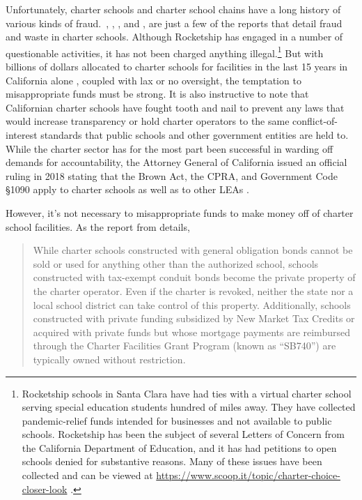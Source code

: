 Unfortunately, charter schools and charter school chains have a long history of various kinds of fraud. \textcite{Lafer2017}, \textcite{ITPT2018}, \textcite{Burris.etal2020}, and \textcite{Burris.Bryant2020}, are just a few of the reports that detail fraud and waste in charter schools. Although Rocketship has engaged in a number of questionable activities, it has not been charged anything illegal.\footnote{Rocketship schools in Santa Clara have had ties with a virtual charter school serving special education students hundred of miles away. They have collected pandemic-relief funds intended for businesses and not available to public schools. Rocketship has been the subject of several Letters of Concern from the California Department of Education, and it has had petitions to open schools denied for substantive reasons. Many of these issues have been collected and can be viewed at \url{https://www.scoop.it/topic/charter-choice-closer-look} \parencite{Marachi2022}.} But with billions of dollars allocated to charter schools for facilities in the last 15 years in California alone \parencite[4]{Lafer2017}, coupled with lax or no oversight, the temptation to misappropriate funds must be strong. It is also instructive to note that Californian charter schools have fought tooth and nail to prevent any laws that would increase transparency or hold charter operators to the same conflict-of-interest standards that public schools and other government entities are held to. While the charter sector has for the most part been successful in warding off demands for accountability, the Attorney General of California issued an official ruling in 2018 stating that the Brown Act, the CPRA, and Government Code §1090 apply to charter schools as well as to other LEAs \parencite{Becerra.Medeiros2018}.

However, it's not necessary to misappropriate funds to make money off of charter school facilities. As the report  from \citeauthor{ITPT2018} details,

\begin{quotation}\noindent\OnehalfSpacing%
While charter schools constructed with general obligation bonds cannot be sold or used for anything other than the authorized school, schools constructed with tax-exempt conduit bonds become the private property of the charter operator. Even if the charter is revoked, neither the state nor a local school district can take control of this property. Additionally, schools constructed with private funding subsidized by New Market Tax Credits or acquired with private funds but whose mortgage payments are reimbursed through the Charter Facilities Grant Program (known as “SB740”) are typically owned without restriction.\\ 
\end{quotation}

